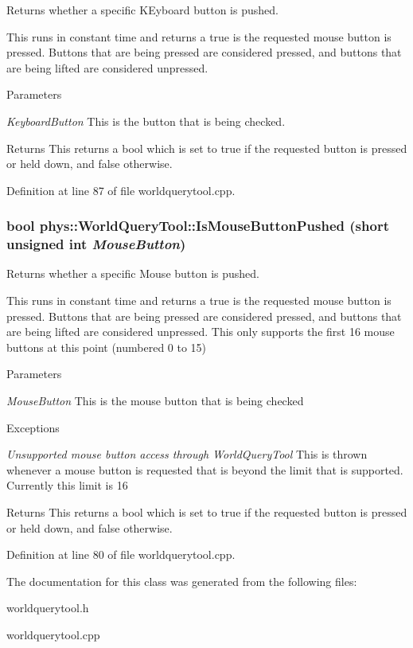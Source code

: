 Returns whether a specific KEyboard button is pushed. 

This runs in constant time and returns a true is the requested mouse button is pressed. Buttons that are being pressed are considered pressed, and buttons that are being lifted are considered unpressed. 
\begin{DoxyParams}{Parameters}
\item[{\em KeyboardButton}]This is the button that is being checked. \end{DoxyParams}
\begin{DoxyReturn}{Returns}
This returns a bool which is set to true if the requested button is pressed or held down, and false otherwise. 
\end{DoxyReturn}


Definition at line 87 of file worldquerytool.cpp.

\hypertarget{classphys_1_1WorldQueryTool_af277b578432dfaefffbc4fd9bb80ca64}{
\subsubsection[{IsMouseButtonPushed}]{\setlength{\rightskip}{0pt plus 5cm}bool phys::WorldQueryTool::IsMouseButtonPushed (short unsigned int {\em MouseButton})}}
\label{d8/d69/classphys_1_1WorldQueryTool_af277b578432dfaefffbc4fd9bb80ca64}


Returns whether a specific Mouse button is pushed. 

This runs in constant time and returns a true is the requested mouse button is pressed. Buttons that are being pressed are considered pressed, and buttons that are being lifted are considered unpressed. This only supports the first 16 mouse buttons at this point (numbered 0 to 15) 
\begin{DoxyParams}{Parameters}
\item[{\em MouseButton}]This is the mouse button that is being checked \end{DoxyParams}

\begin{DoxyExceptions}{Exceptions}
\item[{\em Unsupported mouse button access through WorldQueryTool}]This is thrown whenever a mouse button is requested that is beyond the limit that is supported. Currently this limit is 16 \end{DoxyExceptions}
\begin{DoxyReturn}{Returns}
This returns a bool which is set to true if the requested button is pressed or held down, and false otherwise. 
\end{DoxyReturn}


Definition at line 80 of file worldquerytool.cpp.



The documentation for this class was generated from the following files:\begin{DoxyCompactItemize}
\item 
worldquerytool.h\item 
worldquerytool.cpp\end{DoxyCompactItemize}
